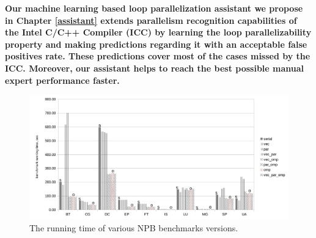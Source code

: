 \textbf{\quad Our machine learning based loop parallelization assistant \cite{assistant-aiseps} we propose in Chapter \ref{assistant} extends parallelism recognition capabilities of the Intel C/C++ Compiler (ICC) by learning the loop parallelizability property and making predictions regarding it with an acceptable false positives rate. These predictions cover most of the cases missed by the ICC. Moreover, our assistant helps to reach the best possible manual expert performance faster.}
\begin{figure}[ht]
\includegraphics[width=1.0\textwidth]{images/benchmark_runtime.pdf}
\caption{The running time of various NPB benchmarks versions.}
\label{fig:benchmarks_runtime}
\end{figure}

